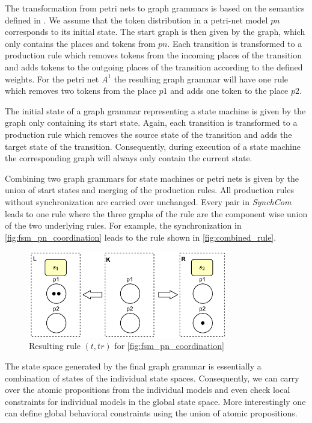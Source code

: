 \documentclass[conference]{IEEEtran}
\begin{document}
The transformation from petri nets to graph grammars is based on the semantics defined in \cite{ehrigGraphGrammarsPetri2004}.
We assume that the token distribution in a petri-net model $pn$ corresponds to its initial state.
The start graph is then given by the graph, which only contains the places and tokens from $pn$.
Each transition is transformed to a production rule which removes tokens from the incoming places of the transition and adds tokens to the outgoing places of the transition according to the defined weights.
For the petri net $A^1$ the resulting graph grammar will have one rule which removes two tokens from the place $p1$ and adds one token to the place $p2$.

The initial state of a graph grammar representing a state machine is given by the graph only containing its start state.
Again, each transition is transformed to a production rule which removes the source state of the transition and adds the target state of the transition.
Consequently, during execution of a state machine the corresponding graph will always only contain the current state.

Combining two graph grammars for state machines or petri nets is given by the union of start states and merging of the production rules.
All production rules without synchronization are carried over unchanged.
Every pair in \textit{SynchCom} leads to one rule where the three graphs of the rule are the component wise union of the two underlying rules.
For example, the synchronization in \autoref{fig:fsm_pn_coordination} leads to the rule shown in \autoref{fig:combined_rule}.

\begin{figure}[h]
    \centering
    \includegraphics[width=3.4in]{combined_rule}
    \caption{Resulting rule $(t,tr)$ for \autoref{fig:fsm_pn_coordination}}
    \label{fig:combined_rule}
\end{figure}

The state space generated by the final graph grammar is essentially a combination of states of the individual state spaces.
Consequently, we can carry over the atomic propositions from the individual models and even check local constraints for individual models in the global state space.
More interestingly one can define global behavioral constraints using the union of atomic propositions.
\end{document}

